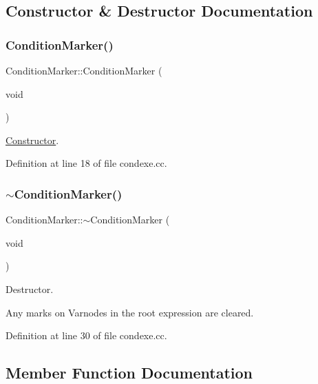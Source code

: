 \subsection{Constructor \& Destructor Documentation}
\mbox{\label{class_condition_marker_ac532df69b0e3b0b529b42f6871e59b85}} 
\subsubsection{\texorpdfstring{ConditionMarker()}{ConditionMarker()}}
{\footnotesize\ttfamily Condition\+Marker\+::\+Condition\+Marker (\begin{DoxyParamCaption}\item[{void}]{ }\end{DoxyParamCaption})}



\mbox{\hyperlink{class_constructor}{Constructor}}. 



Definition at line 18 of file condexe.\+cc.

\mbox{\label{class_condition_marker_aea2636ea1affecfc44cb4aa0c00e8350}} 
\subsubsection{\texorpdfstring{$\sim$ConditionMarker()}{~ConditionMarker()}}
{\footnotesize\ttfamily Condition\+Marker\+::$\sim$\+Condition\+Marker (\begin{DoxyParamCaption}\item[{void}]{ }\end{DoxyParamCaption})}



Destructor. 

Any marks on Varnodes in the root expression are cleared. 

Definition at line 30 of file condexe.\+cc.



\subsection{Member Function Documentation}
\mbox{\label{class_condition_marker_ac1a25557679f0be858c5bee6bd691b23}} 
